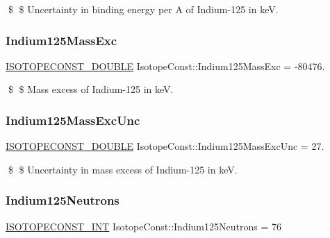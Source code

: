 \$ \$ Uncertainty in binding energy per A of Indium-\/125 in keV. \mbox{\label{group___isotope_const-_indium-_in125_ga8cb6bc51454059cbf661cd6c1fd384ec}} 
\subsubsection{\texorpdfstring{Indium125\+Mass\+Exc}{Indium125MassExc}}
{\footnotesize\ttfamily \mbox{\hyperlink{group___isotope_const-_macros_ga8f45a7272ce02c0b4c65c44636ed719a}{I\+S\+O\+T\+O\+P\+E\+C\+O\+N\+S\+T\+\_\+\+D\+O\+U\+B\+LE}} Isotope\+Const\+::\+Indium125\+Mass\+Exc = -\/80476.}

\$ \$ Mass excess of Indium-\/125 in keV. \mbox{\label{group___isotope_const-_indium-_in125_ga70f231e4156873aa339d71f85ab61d72}} 
\subsubsection{\texorpdfstring{Indium125\+Mass\+Exc\+Unc}{Indium125MassExcUnc}}
{\footnotesize\ttfamily \mbox{\hyperlink{group___isotope_const-_macros_ga8f45a7272ce02c0b4c65c44636ed719a}{I\+S\+O\+T\+O\+P\+E\+C\+O\+N\+S\+T\+\_\+\+D\+O\+U\+B\+LE}} Isotope\+Const\+::\+Indium125\+Mass\+Exc\+Unc = 27.}

\$ \$ Uncertainty in mass excess of Indium-\/125 in keV. \mbox{\label{group___isotope_const-_indium-_in125_gaab6fa32c7adbd4aea99a7872dc80e9b4}} 
\subsubsection{\texorpdfstring{Indium125\+Neutrons}{Indium125Neutrons}}
{\footnotesize\ttfamily \mbox{\hyperlink{group___isotope_const-_macros_ga5f18360b3e99483a35c32d789e62621c}{I\+S\+O\+T\+O\+P\+E\+C\+O\+N\+S\+T\+\_\+\+I\+NT}} Isotope\+Const\+::\+Indium125\+Neutrons = 76}

